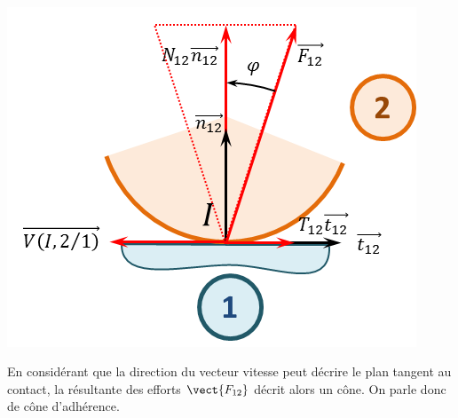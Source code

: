 \documentclass[10pt,fleqn]{article} %
\begin{document}
\begin{minipage}[t]{.29\linewidth}
$\quad$
\begin{center}
\includegraphics[width=\linewidth]{images/fig_03}
\end{center}
\end{minipage}

\begin{rem}
En considérant que la direction du vecteur vitesse peut décrire le plan tangent au contact, la résultante des efforts $\vect{F_{12}}$ décrit alors un cône. On parle donc de cône d'adhérence. 
\end{rem}
\end{document}
